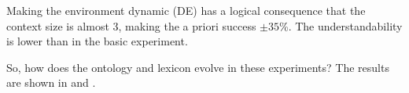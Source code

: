 Making the environment dynamic (DE) has a logical consequence that the context size is almost 3, making the a priori success $\pm 35$\%. The understandability is lower than in the basic experiment.


So, how does the ontology and lexicon evolve in these experiments? The results are shown in  and .

\begin{figure}
\centering
{}
\\
\\

\end{figure}
